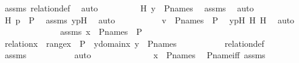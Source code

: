 \begin{isabellebody}
\ assms{}\ relation{\isacharunderscore}{\kern0pt}def\ \isamarkupfalse%
\ auto\isanewline
\ \ \ \ \ \ \isamarkupfalse%
\ \isamarkupfalse%
\ H{}{\isacharcolon}{\kern0pt}\ {\isachardoublequoteopen}y\ {\isasymin}\ P{\isacharunderscore}{\kern0pt}names{\isachardoublequoteclose}\ \isamarkupfalse%
\ assms{}\ \isamarkupfalse%
\ auto\ \isanewline
\ \ \ \ \ \ \isamarkupfalse%
\ \isamarkupfalse%
\ H{}{\isacharcolon}{\kern0pt}\ {\isachardoublequoteopen}p\ {\isasymin}\ P{\isachardoublequoteclose}\ \isamarkupfalse%
\ assms{}\ ypH\ \isamarkupfalse%
\ auto\ \isanewline
\ \ \ \ \ \ \isamarkupfalse%
\ \isamarkupfalse%
\ {\isachardoublequoteopen}v\ {\isasymin}\ P{\isacharunderscore}{\kern0pt}names\ {\isasymtimes}\ P{\isachardoublequoteclose}\ \isamarkupfalse%
\ ypH\ H{}\ H{}\ \isamarkupfalse%
\ auto\ \isanewline
\ \ \ \ \isamarkupfalse%
\ \isanewline
\ \ \ \ \ \ \isamarkupfalse%
\ assms{}{\isacharcolon}{\kern0pt}\ {\isachardoublequoteopen}x\ {\isasymsubseteq}\ P{\isacharunderscore}{\kern0pt}names\ {\isasymtimes}\ P{\isachardoublequoteclose}\ \isanewline
\ \ \ \ \ \ \isamarkupfalse%
\ {\isachardoublequoteopen}relation{\isacharparenleft}{\kern0pt}x{\isacharparenright}{\kern0pt}\ {\isasymand}\ range{\isacharparenleft}{\kern0pt}x{\isacharparenright}{\kern0pt}\ {\isasymsubseteq}\ P\ {\isasymand}\ {\isacharparenleft}{\kern0pt}{\isasymforall}y{\isasymin}domain{\isacharparenleft}{\kern0pt}x{\isacharparenright}{\kern0pt}{\isachardot}{\kern0pt}\ y\ {\isasymin}\ P{\isacharunderscore}{\kern0pt}names{\isacharparenright}{\kern0pt}{\isachardoublequoteclose}\ \isanewline
\ \ \ \ \ \ \ \ \isamarkupfalse%
\ relation{\isacharunderscore}{\kern0pt}def\isanewline
\ \ \ \ \ \ \ \ \isamarkupfalse%
\ assms{}\ \isanewline
\ \ \ \ \ \ \ \ \isamarkupfalse%
\ auto\isanewline
\ \ \ \ \isamarkupfalse%
\isanewline
\ \ \ \ \isamarkupfalse%
\ \isamarkupfalse%
\ {\isachardoublequoteopen}{\isachardot}{\kern0pt}{\isachardot}{\kern0pt}{\isachardot}{\kern0pt}\ {\isasymlongleftrightarrow}\ x\ {\isasymin}\ P{\isacharunderscore}{\kern0pt}names{\isachardoublequoteclose}\ \isamarkupfalse%
\ P{\isacharunderscore}{\kern0pt}name{\isacharunderscore}{\kern0pt}iff\ assms{}\ \isamarkupfalse%

\end{isabellebody}
